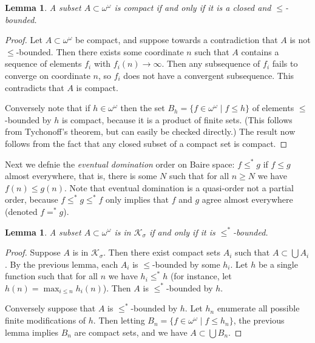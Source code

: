 \documentclass[11pt,oneside]{amsbook}
\newcommand{\R}{\mathbb R}
\theoremstyle{definition}
\theoremstyle{plain}
\newtheorem{lemma}[theorem]{Lemma}
\theoremstyle{definition}
\theoremstyle{remark}
\numberwithin{equation}{section}
\numberwithin{figure}{section}
\begin{document}

\begin{lemma}
  \label{lem:baire-compact}
  A subset $A\subset\omega^\omega$ is compact if and only if it is a closed and $\leq$-bounded.
\end{lemma}

\begin{proof}
  Let $A\subset\omega^\omega$ be compact, and suppose towards a contradiction that $A$ is not $\leq$-bounded. Then there exists some coordinate $n$ such that $A$ contains a sequence of elements $f_i$ with $f_i(n)\to\infty$. Then any subsequence of $f_i$ fails to converge on coordinate $n$, so $f_i$ does not have a convergent subsequence. This contradicts that $A$ is compact.

  Conversely note that if $h\in\omega^\omega$ then the set $B_h=\{f\in\omega^\omega\mid f\leq h\}$ of elements $\leq$-bounded by $h$ is compact, because it is a product of finite sets. (This follows from Tychonoff's theorem, but can easily be checked directly.) The result now follows from the fact that any closed subset of a compact set is compact.
\end{proof}

Next we defnie the \emph{eventual domination} order on Baire space: $f\leq^*g$ if $f\leq g$ almost everywhere, that is, there is some $N$ such that for all $n\geq N$ we have $f(n)\leq g(n)$. Note that eventual domination is a quasi-order not a partial order, because $f\leq^*g\leq^*f$ only implies that $f$ and $g$ agree almost everywhere (denoted $f=^*g$).

\begin{lemma}
  \label{lem:sigma-compact-bounded}
  A subset $A\subset\omega^\omega$ is in $\mathcal K_\sigma$ if and only if it is $\leq^*$-bounded.
\end{lemma}

\begin{proof}
  Suppose $A$ is in $\mathcal K_\sigma$. Then there exist compact sets $A_i$ such that $A\subset\bigcup A_i$. By the previous lemma, each $A_i$ is $\leq$-bounded by some $h_i$. Let $h$ be a single function such that for all $n$ we have $h_i\leq^* h$ (for instance, let $h(n)=\max_{i\leq n}h_i(n)$). Then $A$ is $\leq^*$-bounded by $h$.
  
  Conversely suppose that $A$ is $\leq^*$-bounded by $h$. Let $h_n$ enumerate all possible finite modifications of $h$. Then letting $B_n=\{f\in\omega^\omega\mid f\leq h_n\}$, the previous lemma implies $B_n$ are compact sets, and we have $A\subset\bigcup B_n$.
\end{proof}
\end{document}

